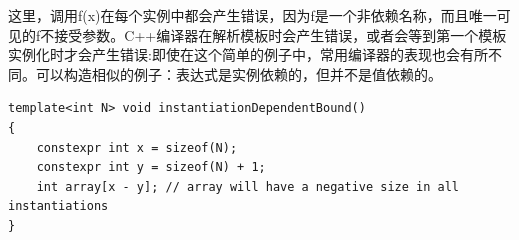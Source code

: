 这里，调用f(x)在每个实例中都会产生错误，因为f是一个非依赖名称，而且唯一可见的f不接受参数。C++编译器在解析模板时会产生错误，或者会等到第一个模板实例化时才会产生错误:即使在这个简单的例子中，常用编译器的表现也会有所不同。可以构造相似的例子：表达式是实例依赖的，但并不是值依赖的。

\begin{lstlisting}[style=styleCXX]
template<int N> void instantiationDependentBound()
{
	constexpr int x = sizeof(N);
	constexpr int y = sizeof(N) + 1;
	int array[x - y]; // array will have a negative size in all instantiations
}
\end{lstlisting}











